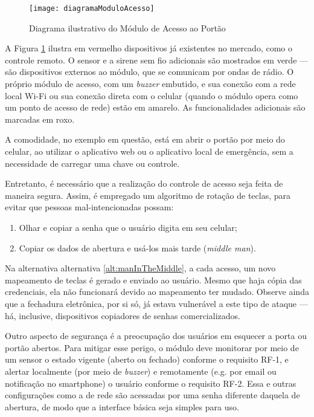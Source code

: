 \begin{figure}[H]
	\centering
	\caption{Diagrama ilustrativo do Módulo de Acesso ao Portão}
  \texttt{[image: diagramaModuloAcesso]}
\label{fig:diagramaModuloAcesso}
\end{figure}

A Figura \ref{fig:diagramaModuloAcesso} ilustra em vermelho dispositivos já existentes no mercado, como o controle remoto. O sensor e a sirene sem fio adicionais são mostrados em verde --- são dispositivos externos ao módulo, que se comunicam por ondas de rádio. O próprio módulo de acesso, com um \emph{buzzer} embutido, e sua conexão com a rede local Wi-Fi ou sua conexão direta com o celular (quando o módulo opera como um ponto de acesso de rede) estão em amarelo. As funcionalidades adicionais são marcadas em roxo.

A comodidade, no exemplo em questão, está em abrir o portão por meio do celular, ao utilizar o aplicativo web ou o aplicativo local de emergência, sem a necessidade de carregar uma chave ou controle.

Entretanto, é necessário que a realização do controle de acesso seja feita de maneira segura. Assim, é empregado um algoritmo de rotação de teclas, para evitar que pessoas mal-intencionadas possam:

\begin{enumerate}
	\item Olhar e copiar a senha que o usuário digita em seu celular;
	\item \label{alt:manInTheMiddle} Copiar os dados de abertura e usá-los mais tarde (\textit{middle man}).
\end{enumerate}

Na alternativa alternativa \ref{alt:manInTheMiddle}, a cada acesso, um novo mapeamento de teclas é gerado e enviado ao usuário. Mesmo que haja cópia das credenciais, ela não funcionará devido ao mapeamento ter mudado. Observe ainda que a fechadura eletrônica, por si só, já estava vulnerável a este tipo de ataque --- há, inclusive, dispositivos copiadores de senhas comercializados.

Outro aspecto de segurança é a preocupação dos usuários em esquecer a porta ou portão abertos. Para mitigar esse perigo, o módulo deve monitorar por meio de um sensor o estado vigente (aberto ou fechado) conforme o requisito RF-1, e alertar localmente (por meio de \textit{buzzer}) e remotamente (e.g. por email ou notificação no smartphone) o usuário conforme o requisito RF-2. Essa e outras configurações como a de rede são acessadas por uma senha diferente daquela de abertura, de modo que a interface básica seja simples para uso.

